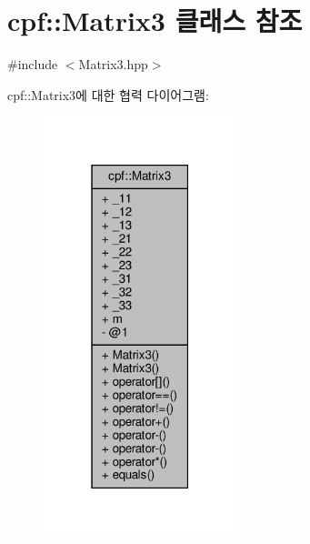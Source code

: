 \hypertarget{classcpf_1_1_matrix3}{}\section{cpf\+:\+:Matrix3 클래스 참조}
\label{classcpf_1_1_matrix3}


{\ttfamily \#include $<$Matrix3.\+hpp$>$}



cpf\+:\+:Matrix3에 대한 협력 다이어그램\+:
\nopagebreak
\begin{figure}[H]
\begin{center}
\leavevmode
\includegraphics[width=159pt]{classcpf_1_1_matrix3__coll__graph}
\end{center}
\end{figure}
